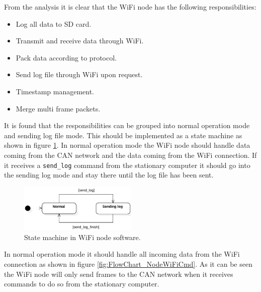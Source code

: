 From the analysis it is clear that the WiFi node has the following responsibilities:

\begin{itemize}
\item Log all data to SD card.
\item Transmit and receive data through WiFi.
\item Pack data according to protocol.
\item Send log file through WiFi upon request.
\item Timestamp management.
\item Merge multi frame packets.
\end{itemize}

It is found that the responsibilities can be grouped into normal operation mode and sending log file mode.
This should be implemented as a state machine as shown in figure \ref{fig:StateDiagram_NodeWiFiStates}.
In normal operation mode the WiFi node should handle data coming from the CAN network and the data coming from the WiFi connection.
If it receives a \texttt{send\_log} command from the stationary computer it should go into the sending log mode and stay there until the log file has been sent.

\begin{figure}[!h]
\centering
\includegraphics[width=0.5\textwidth]{graphics/StateDiagram_NodeWiFiStates}
\caption{State machine in WiFi node software.}
\label{fig:StateDiagram_NodeWiFiStates}
\end{figure}

In normal operation mode it should handle all incoming data from the WiFi connection as shown in figure \ref{fig:FlowChart_NodeWiFiCmd}.
As it can be seen the WiFi node will only send frames to the CAN network when it receives commands to do so from the stationary computer.

